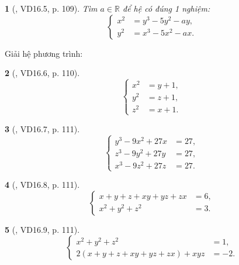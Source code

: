 \documentclass{article}
\newtheorem{baitoan}{}
\begin{document}
\begin{baitoan}[\cite{TLCT_THCS_Toan_9_dai_so}, VD16.5, p. 109]
	Tìm $a\in\mathbb{R}$ để hệ có đúng 1 nghiệm:
	\begin{equation*}
		\left\{\begin{split}
			x^2 &= y^3 - 5y^2 - ay,\\
			y^2 &= x^3 - 5x^2 - ax.
		\end{split}\right.
	\end{equation*}
\end{baitoan}
Giải hệ phương trình:

\begin{baitoan}[\cite{TLCT_THCS_Toan_9_dai_so}, VD16.6, p. 110]	
	\begin{equation*}
		\left\{\begin{split}
			x^2 &= y + 1,\\
			y^2 &= z + 1,\\
			z^2 &= x + 1.
		\end{split}\right.
	\end{equation*}
\end{baitoan}

\begin{baitoan}[\cite{TLCT_THCS_Toan_9_dai_so}, VD16.7, p. 111]
	\begin{equation*}
		\left\{\begin{split}
			y^3 - 9x^2 + 27x &= 27,\\
			z^3 - 9y^2 + 27y &= 27,\\
			x^3 - 9z^2 + 27z &= 27.
		\end{split}\right.
	\end{equation*}
\end{baitoan}

\begin{baitoan}[\cite{TLCT_THCS_Toan_9_dai_so}, VD16.8, p. 111]
	\begin{equation*}
		\left\{\begin{split}
			x + y + z + xy + yz + zx &= 6,\\
			x^2 + y^2 + z^2 &= 3.
		\end{split}\right.
	\end{equation*}
\end{baitoan}

\begin{baitoan}[\cite{TLCT_THCS_Toan_9_dai_so}, VD16.9, p. 111]
	\begin{equation*}
		\left\{\begin{split}
			x^2 + y^2 + z^2 &= 1,\\
			2(x + y + z + xy + yz + zx) + xyz &= -2.
		\end{split}\right.
	\end{equation*}
\end{baitoan}
\end{document}
